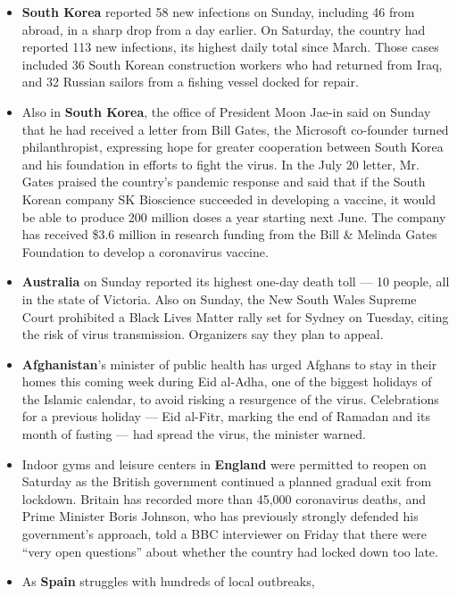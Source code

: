 \begin{itemize}
\item
  \textbf{South Korea} reported 58 new infections on Sunday, including
  46 from abroad, in a sharp drop from a day earlier. On Saturday, the
  country had reported 113 new infections, its highest daily total since
  March. Those cases included 36 South Korean construction workers who
  had returned from Iraq, and 32 Russian sailors from a fishing vessel
  docked for repair.
\item
  Also in \textbf{South Korea}, the office of President Moon Jae-in said
  on Sunday that he had received a letter from Bill Gates, the Microsoft
  co-founder turned philanthropist, expressing hope for greater
  cooperation between South Korea and his foundation in efforts to fight
  the virus. In the July 20 letter, Mr. Gates praised the country's
  pandemic response and said that if the South Korean company SK
  Bioscience succeeded in developing a vaccine, it would be able to
  produce 200 million doses a year starting next June. The company has
  received \$3.6 million in research funding from the Bill \& Melinda
  Gates Foundation to develop a coronavirus vaccine.
\item
  \textbf{Australia} on Sunday reported its highest one-day death toll
  --- 10 people, all in the state of Victoria. Also on Sunday, the New
  South Wales Supreme Court prohibited a Black Lives Matter rally set
  for Sydney on Tuesday, citing the risk of virus transmission.
  Organizers say they plan to appeal.
\item
  \textbf{Afghanistan}'s minister of public health has urged Afghans to
  stay in their homes this coming week during Eid al-Adha, one of the
  biggest holidays of the Islamic calendar, to avoid risking a
  resurgence of the virus. Celebrations for a previous holiday --- Eid
  al-Fitr, marking the end of Ramadan and its month of fasting --- had
  spread the virus, the minister warned.
\item
  Indoor gyms and leisure centers in \textbf{England} were permitted to
  reopen on Saturday as the British government continued a planned
  gradual exit from lockdown. Britain has recorded more than 45,000
  coronavirus deaths, and Prime Minister Boris Johnson, who has
  previously strongly defended his government's approach, told a BBC
  interviewer on Friday that there were ``very open questions'' about
  whether the country had locked down too late.
\item
  As \textbf{Spain} struggles with hundreds of local outbreaks,

\end{itemize}
